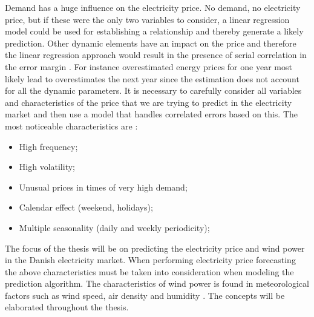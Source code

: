 Demand has a huge influence on the electricity price. No demand, no electricity price, but if these were the only two variables to consider, a linear regression model could be used for establishing a relationship and thereby generate a likely prediction. Other dynamic elements have an impact on the price and therefore the linear regression approach would result in the presence of serial correlation in the error margin \cite{21}. For instance overestimated energy prices for one year most likely lead to overestimates the next year since the estimation does not account for all the dynamic parameters. It is necessary to carefully consider all variables and characteristics of the price that we are trying to predict in the electricity market and then use a model that handles correlated errors based on this. The most noticeable characteristics are \cite{21}:
\begin{itemize}
\item High frequency;
\item High volatility;
\item Unusual prices in times of very high demand;
\item Calendar effect (weekend, holidays);
\item Multiple seasonality (daily and weekly periodicity);
\end{itemize}
The focus of the thesis will be on predicting the electricity price and wind power in the Danish electricity market. When performing electricity price forecasting the above characteristics must be taken into consideration when modeling the prediction algorithm. The characteristics of wind power is found in meteorological factors such as wind speed, air density and humidity \cite{WindPowerGenerationUsingANN}. The concepts will be elaborated throughout the thesis.